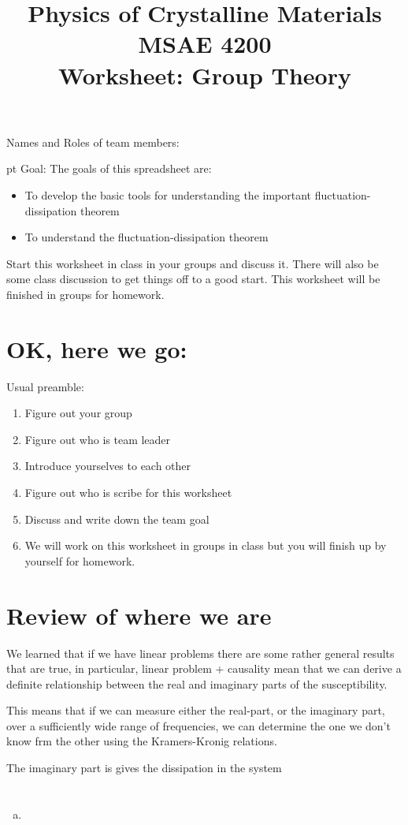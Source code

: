 \documentclass[]{revtex4}
\begin{document}
\title{Physics of Crystalline Materials\\
MSAE 4200\\
Worksheet: Group Theory}

\maketitle

\vskip 24pt
{Names and Roles of team members:}

 pt
Goal: The goals of this spreadsheet are:
\begin{itemize}
\item To develop the basic tools for understanding the important fluctuation-dissipation theorem
\item To understand the fluctuation-dissipation theorem
\end{itemize}

\cork{}
\vskip 12pt



Start this worksheet in class in your groups and discuss it.  There will also be some class discussion to get things off to a good start.
This worksheet will be finished in groups for  homework.

\section*{OK, here we go:}
Usual preamble:
\begin{enumerate}
  \item Figure out your group
  \item Figure out who is team leader
  \item Introduce yourselves to each other
  \item Figure out who is scribe for this worksheet
  \item Discuss and write down the team goal
  \item We will work on this worksheet in groups in class but you will finish up by yourself for homework.
\end{enumerate}

\section*{Review of where we are}
\bi
\item We learned that if we have linear problems there are some rather general results that are true, in particular, linear problem + causality
mean that we can derive a definite relationship between the real and imaginary parts of the susceptibility.
\item This means that if we can measure either the real-part, or the imaginary part, over a sufficiently wide range of frequencies,
we can determine the one we don't know frm the other using the Kramers-Kronig relations.
\item The imaginary part is gives the dissipation in the system
\ei

\section*{}
\begin{enumerate}[(a)]
  \item 
\end{enumerate}
\end{document}
